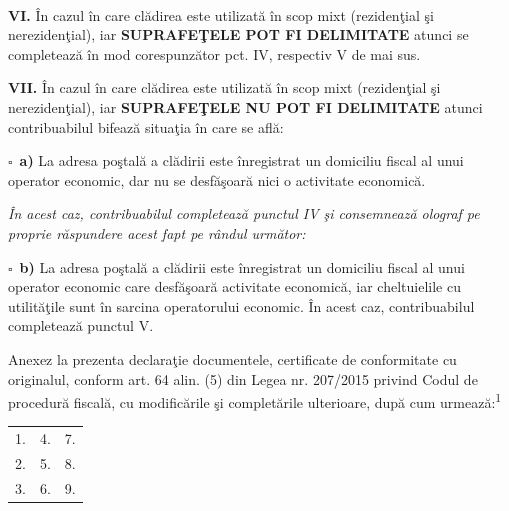 \documentclass[8pt,a4paper,landscape]{extarticle}
\newcommand{\fillline}[1][6cm]{\underline{\hspace{#1}}}
\newcommand{\checkboxempty}{$\square$}
\begin{document}
\vspace{0.15cm}
\hrulefill \\
\hrulefill

\vspace{0.5cm}

\textbf{VI.} În cazul în care clădirea este utilizată în scop mixt (rezidenţial şi nerezidenţial), iar \textbf{SUPRAFEŢELE POT FI DELIMITATE} atunci se completează în mod corespunzător pct. IV, respectiv V de mai sus.

\vspace{0.15cm}

\textbf{VII.} În cazul în care clădirea este utilizată în scop mixt (rezidenţial şi nerezidenţial), iar \textbf{SUPRAFEŢELE NU POT FI DELIMITATE} atunci contribuabilul bifează situaţia în care se află:

\vspace{0.15cm}

\checkboxempty\ \textbf{a)} La adresa poştală a clădirii este înregistrat un domiciliu fiscal al unui operator economic, dar nu se desfăşoară nici o activitate economică.

\textit{În acest caz, contribuabilul completează punctul IV şi consemnează olograf pe proprie răspundere acest fapt pe rândul următor:}\\
\hrulefill

\vspace{0.15cm}

\checkboxempty\ \textbf{b)} La adresa poştală a clădirii este înregistrat un domiciliu fiscal al unui operator economic care desfăşoară activitate economică, iar cheltuielile cu utilităţile sunt în sarcina operatorului economic. În acest caz, contribuabilul completează punctul V.

\vspace{0.5cm}

Anexez la prezenta declaraţie documentele, certificate de conformitate cu originalul, conform art. 64 alin. (5) din Legea nr. 207/2015 privind Codul de procedură fiscală, cu modificările şi completările ulterioare, după cum urmează:\textsuperscript{1}

\begin{tabularx}{\textwidth}{XXX}
1. \fillline[5cm] & 4. \fillline[5cm] & 7. \fillline[5cm] \\
2. \fillline[5cm] & 5. \fillline[5cm] & 8. \fillline[5cm] \\
3. \fillline[5cm] & 6. \fillline[5cm] & 9. \fillline[5cm] \\
\end{tabularx}
\end{document}
